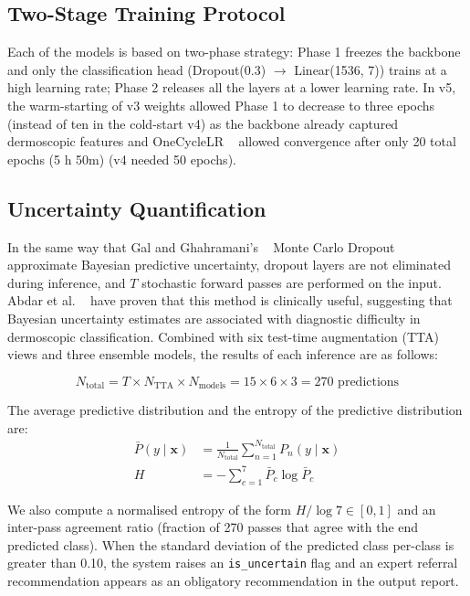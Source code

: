 \documentclass[conference]{IEEEtran}
\begin{document}
\subsection{Two-Stage Training Protocol}

Each of the models is based on two-phase strategy: Phase 1 freezes the backbone and only the classification head (Dropout(0.3) $\rightarrow$ Linear(1536, 7)) trains at a high learning rate; Phase 2 releases all the layers at a lower learning rate. In v5, the warm-starting of v3 weights allowed Phase 1 to decrease to three epochs (instead of ten in the cold-start v4) as the backbone already captured dermoscopic features and OneCycleLR ~\cite{smith2019superconvergence} allowed convergence after only 20 total epochs (5 h 50m) (v4 needed 50 epochs).

\subsection{Uncertainty Quantification}

In the same way that Gal and Ghahramani's ~\cite{gal2016dropout} Monte Carlo Dropout approximate Bayesian predictive uncertainty, dropout layers are not eliminated during inference, and $T$ stochastic forward passes are performed on the input. Abdar et al. ~\cite{abdar2021uncertainty} have proven that this method is clinically useful, suggesting that Bayesian uncertainty estimates are associated with diagnostic difficulty in dermoscopic classification. Combined with six test-time augmentation (TTA) views and three ensemble models, the results of each inference are as follows:


\begin{equation}
N_{\text{total}} = T \times N_{\text{TTA}} \times N_{\text{models}} = 15 \times 6 \times 3 = 270 \text{ predictions}
\end{equation}

The average predictive distribution and the entropy of the predictive distribution are:
\begin{align}
\bar{P}(y \mid \mathbf{x}) &= \frac{1}{N_{\text{total}}} \sum_{n=1}^{N_{\text{total}}} P_n(y \mid \mathbf{x}) \\
H &= -\sum_{c=1}^{7} \bar{P}_c \log \bar{P}_c
\end{align}

We also compute a normalised entropy of the form $H / \log 7 \in [0,1]$ and an inter-pass agreement ratio (fraction of 270 passes that agree with the end predicted class). When the standard deviation of the predicted class per-class is greater than 0.10, the system raises an \texttt{is\_uncertain} flag and an expert referral recommendation appears as an obligatory recommendation in the output report.
\end{document}
